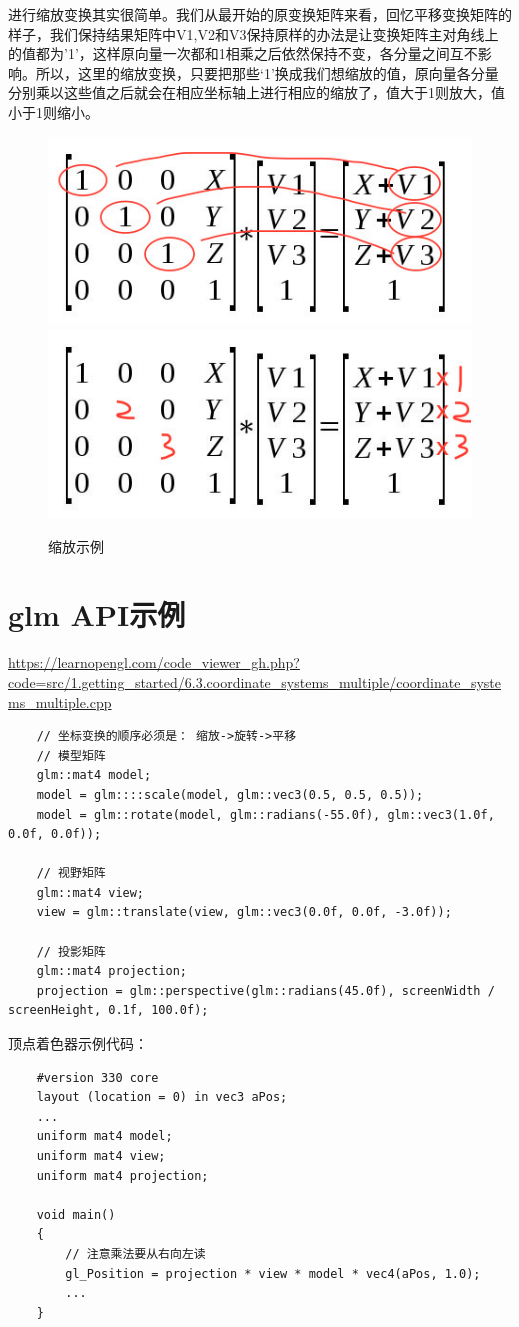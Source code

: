 \documentclass[UTF8,a4paper,12pt]{ctexbook}
\begin{document}
		进行缩放变换其实很简单。我们从最开始的原变换矩阵来看，回忆平移变换矩阵的样子，我们保持结果矩阵中V1,V2和V3保持原样的办法是让变换矩阵主对角线上的值都为’1’，这样原向量一次都和1相乘之后依然保持不变，各分量之间互不影响。所以，这里的缩放变换，只要把那些‘1’换成我们想缩放的值，原向量各分量分别乘以这些值之后就会在相应坐标轴上进行相应的缩放了，值大于1则放大，值小于1则缩小。
		
		\begin{figure}[H]
			\centering
			\includegraphics[width=.46\linewidth]{scale_1.png}
			\includegraphics[width=.46\linewidth]{scale_2.png}
			\caption{缩放示例}
		\end{figure}
		
		
		
	\section{glm API示例}
		
		\url{https://learnopengl.com/code_viewer_gh.php?code=src/1.getting_started/6.3.coordinate_systems_multiple/coordinate_systems_multiple.cpp}
	
		\begin{lstlisting}
	// 坐标变换的顺序必须是： 缩放->旋转->平移
	// 模型矩阵
	glm::mat4 model;
	model = glm::::scale(model, glm::vec3(0.5, 0.5, 0.5));
	model = glm::rotate(model, glm::radians(-55.0f), glm::vec3(1.0f, 0.0f, 0.0f));	
	
	// 视野矩阵
	glm::mat4 view;
	view = glm::translate(view, glm::vec3(0.0f, 0.0f, -3.0f));
	
	// 投影矩阵
	glm::mat4 projection;
	projection = glm::perspective(glm::radians(45.0f), screenWidth / screenHeight, 0.1f, 100.0f);	
		\end{lstlisting}

		顶点着色器示例代码：		
		\begin{lstlisting}
	#version 330 core
	layout (location = 0) in vec3 aPos;
	...
	uniform mat4 model;
	uniform mat4 view;
	uniform mat4 projection;
	
	void main()
	{
	    // 注意乘法要从右向左读
	    gl_Position = projection * view * model * vec4(aPos, 1.0);
	    ...
	}	
		\end{lstlisting}
		
\end{document}

